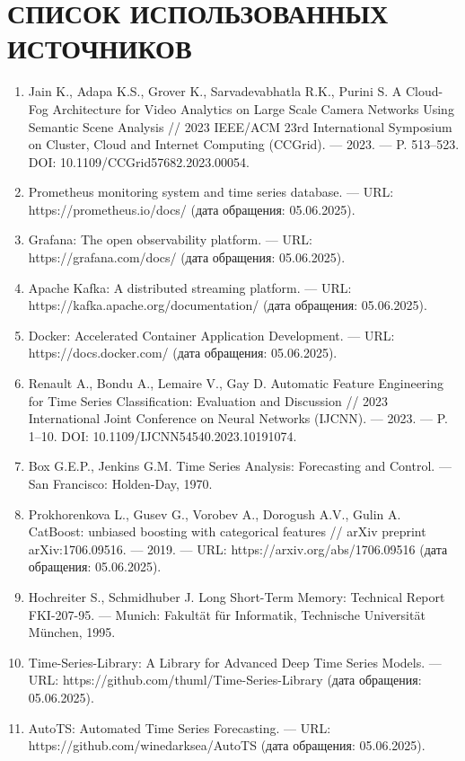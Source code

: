 \chapter*{СПИСОК ИСПОЛЬЗОВАННЫХ ИСТОЧНИКОВ}


\begin{enumerate}[label=\arabic*)\hspace{1em}, leftmargin=1cm, itemsep=0em]
	\item Jain K., Adapa K.S., Grover K., Sarvadevabhatla R.K., Purini S. A Cloud-Fog Architecture for Video Analytics on Large Scale Camera Networks Using Semantic Scene Analysis // 2023 IEEE/ACM 23rd International Symposium on Cluster, Cloud and Internet Computing (CCGrid). — 2023. — P. 513–523. DOI: 10.1109/CCGrid57682.2023.00054.
	\item Prometheus monitoring system and time series database. — URL: https://prometheus.io/docs/ (дата обращения: 05.06.2025).
	\item Grafana: The open observability platform. — URL: https://grafana.com/docs/ (дата обращения: 05.06.2025).
	\item Apache Kafka: A distributed streaming platform. — URL: https://kafka.apache.org/documentation/ (дата обращения: 05.06.2025).
	\item Docker: Accelerated Container Application Development. — URL: https://docs.docker.com/ (дата обращения: 05.06.2025).
	\item Renault A., Bondu A., Lemaire V., Gay D. Automatic Feature Engineering for Time Series Classification: Evaluation and Discussion // 2023 International Joint Conference on Neural Networks (IJCNN). — 2023. — P. 1–10. DOI: 10.1109/IJCNN54540.2023.10191074.
	\item Box G.E.P., Jenkins G.M. Time Series Analysis: Forecasting and Control. — San Francisco: Holden-Day, 1970.
	\item Prokhorenkova L., Gusev G., Vorobev A., Dorogush A.V., Gulin A. CatBoost: unbiased boosting with categorical features // arXiv preprint arXiv:1706.09516. — 2019. — URL: https://arxiv.org/abs/1706.09516 (дата обращения: 05.06.2025).
	\item Hochreiter S., Schmidhuber J. Long Short-Term Memory: Technical Report FKI-207-95. — Munich: Fakultät für Informatik, Technische Universität München, 1995.
	\item Time-Series-Library: A Library for Advanced Deep Time Series Models. — URL: https://github.com/thuml/Time-Series-Library (дата обращения: 05.06.2025).
	\item AutoTS: Automated Time Series Forecasting. — URL: https://github.com/winedarksea/AutoTS (дата обращения: 05.06.2025).
\end{enumerate}